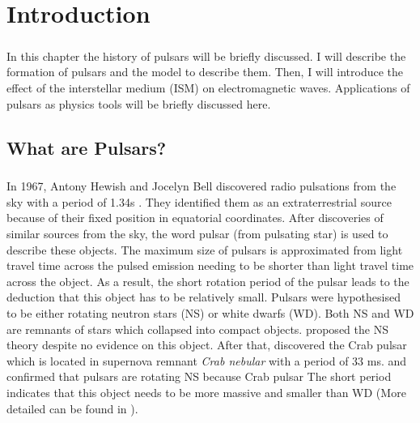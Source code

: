 \documentclass[thesis_msc.tex]{subfiles}
\begin{document}
\chapter{Introduction} \label{intro}
 
     \paragraph{} In this chapter the history of pulsars will be briefly discussed. I will describe the formation of pulsars and the model to describe them. Then, I will introduce the effect of the interstellar medium (ISM) on electromagnetic waves. Applications of pulsars as physics tools will be briefly discussed here. 


    \section{What are Pulsars?}
    \paragraph{} In 1967, Antony Hewish and Jocelyn Bell discovered radio pulsations from the sky with a period of 1.34s \citep{HEWISH1968}. They identified them as an extraterrestrial source because of their fixed position in equatorial coordinates.  After discoveries of similar sources from the sky, the word pulsar (from pulsating star) is used to describe these objects. The maximum size of pulsars is approximated from light travel time across the pulsed emission \citep{HEWISH1968} needing to be shorter than light travel time across the object. As a result, the short rotation period of the pulsar leads to the deduction that this object has to be relatively small. Pulsars were hypothesised to be either rotating neutron stars (NS) or white dwarfs (WD). Both NS and WD are remnants of stars which collapsed into compact objects. \cite{PhysRev.46.76.2} proposed the NS theory despite no evidence on this object. After that, \citep{staelin1969passive} discovered the Crab pulsar which  is located in supernova remnant \textit{Crab nebular}  with a period of 33 ms.  \cite{PACINI1967} and \cite{GOLD1968} confirmed that pulsars are rotating NS because Crab pulsar The short period indicates that this object needs to be more massive and smaller than WD (More detailed can be found in \cite{GOLD1968}).   
               
\end{document}
